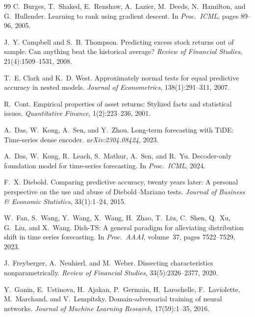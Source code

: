 \documentclass[11pt]{article}
\begin{document}
\begin{thebibliography}{99}
C.~Burges, T.~Shaked, E.~Renshaw, A.~Lazier, M.~Deeds, N.~Hamilton,
and G.~Hullender.
Learning to rank using gradient descent.
In \emph{Proc.\ ICML}, pages 89--96, 2005.

J.~Y. Campbell and S.~B. Thompson.
Predicting excess stock returns out of sample: Can anything beat the
historical average?
\emph{Review of Financial Studies}, 21(4):1509--1531, 2008.

T.~E. Clark and K.~D. West.
Approximately normal tests for equal predictive accuracy in nested models.
\emph{Journal of Econometrics}, 138(1):291--311, 2007.

R.~Cont.
Empirical properties of asset returns: Stylized facts and statistical
issues.
\emph{Quantitative Finance}, 1(2):223--236, 2001.

A.~Das, W.~Kong, A.~Sen, and Y.~Zhou.
Long-term forecasting with TiDE: Time-series dense encoder.
\emph{arXiv:2304.08424}, 2023.

A.~Das, W.~Kong, R.~Leach, S.~Mathur, A.~Sen, and R.~Yu.
Decoder-only foundation model for time-series forecasting.
In \emph{Proc.\ ICML}, 2024.

F.~X. Diebold.
Comparing predictive accuracy, twenty years later: A personal perspective on
the use and abuse of Diebold--Mariano tests.
\emph{Journal of Business \& Economic Statistics}, 33(1):1--24, 2015.

W.~Fan, S.~Wang, Y.~Wang, X.~Wang, H.~Zhao, T.~Liu, C.~Shen, Q.~Xu,
G.~Liu, and X.~Wang.
Dish-TS: A general paradigm for alleviating distribution shift in time
series forecasting.
In \emph{Proc.\ AAAI}, volume~37, pages 7522--7529, 2023.

J.~Freyberger, A.~Neuhierl, and M.~Weber.
Dissecting characteristics nonparametrically.
\emph{Review of Financial Studies}, 33(5):2326--2377, 2020.

Y.~Ganin, E.~Ustinova, H.~Ajakan, P.~Germain, H.~Larochelle, F.~Laviolette,
M.~Marchand, and V.~Lempitsky.
Domain-adversarial training of neural networks.
\emph{Journal of Machine Learning Research}, 17(59):1--35, 2016.


\end{thebibliography}
\end{document}
